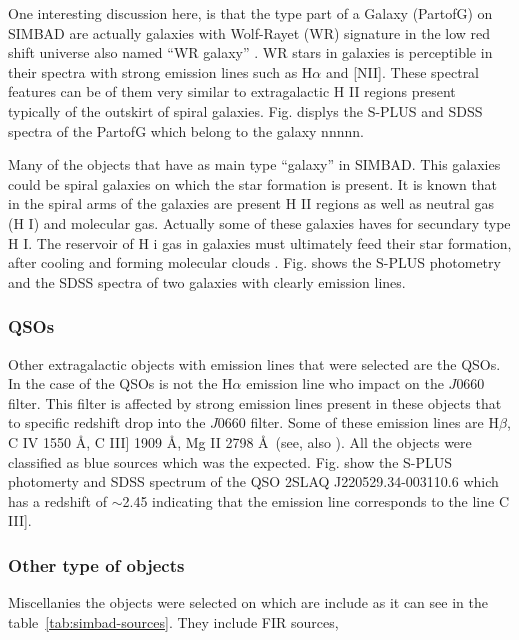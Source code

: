 \documentclass[fleqn,usenatbib]{mnras}
\begin{document}
{One interesting discussion here, is that the type part of a Galaxy (PartofG)
on SIMBAD are actually galaxies with Wolf-Rayet (WR) signature in the low red shift
universe also named ``WR galaxy'' \citep{Osterbrock:1982}. WR stars in galaxies
is perceptible in their spectra with strong emission lines such as H{$\alpha$}
and [NII]. These spectral features can be of them very similar to extragalactic
H II regions present typically of the outskirt of spiral galaxies. Fig. displys
the S-PLUS and SDSS spectra of the PartofG which belong to the galaxy nnnnn.

Many of the objects that have as main type ``galaxy'' in SIMBAD. This galaxies
could be spiral galaxies on which the star formation is present. It is known
that in the spiral arms of the galaxies are present H II regions as well as
neutral gas (H I) and molecular gas. Actually some of these galaxies haves for
secundary type H I. The reservoir of H i gas in galaxies must ultimately
feed their star formation, after cooling and forming molecular
clouds \citep{van-Driel:2016}. Fig. shows the S-PLUS photometry and
the SDSS spectra of two galaxies with clearly emission lines.




\subsubsection{QSOs}
Other extragalactic objects with emission lines that were selected are the
QSOs. In the case of the QSOs is not the H{$\alpha$} emission line who impact
on the $J$0660 filter. This filter is affected by strong emission lines present in
these objects that to specific redshift drop into the $J$0660 filter.
Some of these emission lines are H{$\beta$}, C {\sc IV} 1550 \AA, C {\sc III]} 1909 \AA,
  Mg {\sc II} 2798 \AA~(see, also \citealp{Gutierrez:2020, Nakazono:2021}).
  All the objects were classified as blue sources which was the expected.
  Fig. show the S-PLUS photomerty and SDSS spectrum of the QSO 2SLAQ J220529.34-003110.6
  which has a redshift of $\sim$2.45 indicating that the emission line corresponds to
  the line C {\sc III]}.
  

  \subsubsection{Other type of objects}
  Miscellanies the objects were selected on which are include as it can see in the
  table~\ref{tab:simbad-sources}. They include FIR sources, 


}
\end{document}
